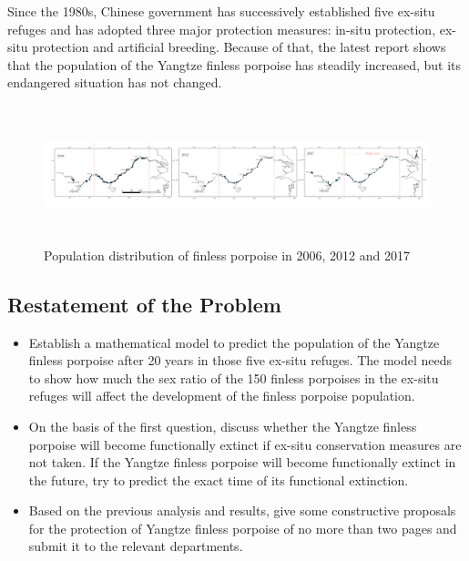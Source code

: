 \documentclass[12pt]{article}  %
\begin{document}
Since the 1980s, Chinese government has successively established five ex-situ refuges and has adopted three major protection measures: in-situ protection, ex-situ protection and artificial breeding. Because of that, the latest report shows that the population of the Yangtze finless porpoise has steadily increased, but its endangered situation has not changed.
\begin{figure}[htbp]%
	\small
	\centering
	\includegraphics[height=4cm,width=16cm]{figures/num_changes.png}%
	\caption{Population distribution of finless porpoise in 2006, 2012 and 2017}%
\end{figure}
\subsection{Restatement of the Problem}%

\begin{itemize}%
	\item Establish a mathematical model to predict the population of the Yangtze finless porpoise after 20 years in those five ex-situ refuges. The model needs to show how much the sex ratio of the 150 finless porpoises in the ex-situ refuges will affect the development of the finless porpoise population.
	\item On the basis of the first question, discuss whether the Yangtze finless porpoise will become functionally extinct if ex-situ conservation measures are not taken. If the Yangtze finless porpoise will become functionally extinct in the future, try to predict the exact time of its functional extinction.
	\item Based on the previous analysis and results, give some constructive proposals for the protection of Yangtze finless porpoise of no more than two pages and submit it to the relevant departments.
\end{itemize}
\end{document}

